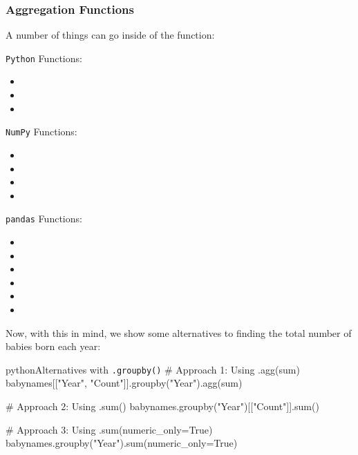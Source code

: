 \documentclass[openany]{book}
\begin{document}
\subsubsection{Aggregation Functions}
A number of things can go inside of the  function:
\begin{paracol}{3}
	\texttt{Python} Functions:
	\begin{itemize}
		\item {}
		\item {}
		\item {}
	\end{itemize}
	\switchcolumn
	\texttt{NumPy} Functions:
	\begin{itemize}
		\item {}
		\item {}
		\item {}
		\item {}
	\end{itemize}
	\switchcolumn
	\texttt{pandas} Functions:
	\begin{itemize}
		\item {}
		\item {}
		\item {}
		\item {}
		\item {}
		\item {}
	\end{itemize}
\end{paracol}

Now, with this in mind, we show some alternatives to finding the total number of babies born each year:

\begin{code}{python}{Alternatives with \texttt{.groupby()}}
# Approach 1: Using .agg(sum)
babynames[["Year", "Count"]].groupby("Year").agg(sum)

# Approach 2: Using .sum()
babynames.groupby("Year")[["Count"]].sum()

# Approach 3: Using .sum(numeric_only=True)
babynames.groupby("Year").sum(numeric_only=True) 
\end{code}
\end{document}
